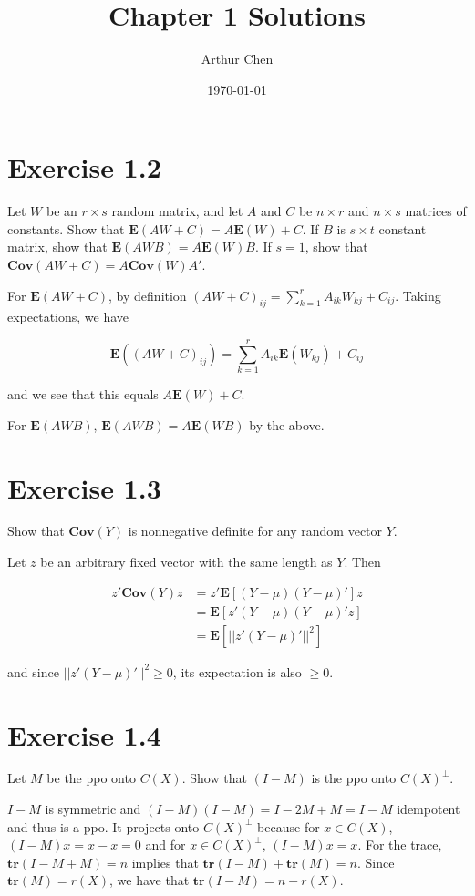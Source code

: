 \documentclass{article}
\author{Arthur Chen}
\title{Chapter 1 Solutions}
\date{\today}
\newcommand{\E}{\boldsymbol{E}}
\newcommand{\cov}{\boldsymbol{Cov}}
\newcommand{\tr}{\boldsymbol{tr}}
\begin{document}
\maketitle

\section*{Exercise 1.2}

Let $W$ be an $r \times s$ random matrix, and let $A$ and $C$ be $n \times r$ and $n \times s$ matrices of constants. Show that $\E(AW+C) = A\E(W) + C$. If $B$ is $s \times t$ constant matrix, show that $\E(AWB) = A\E(W)B$. If $s=1$, show that $\cov(AW+C) = A\cov(W)A'$.

For $\E(AW+C)$, by definition $(AW+C)_{ij} = \sum_{k=1}^r A_{ik}W_{kj} + C_{ij}$. Taking expectations, we have

\[
\E((AW+C)_{ij}) = \sum_{k=1}^r A_{ik}\E(W_{kj}) + C_{ij}
\]

and we see that this equals $A\E(W)+C$.

For $\E(AWB)$, $\E(AWB) = A\E(WB)$ by the above.

\section*{Exercise 1.3}

Show that $\cov(Y)$ is nonnegative definite for any random vector $Y$.

Let $z$ be an arbitrary fixed vector with the same length as $Y$. Then

\begin{align*}
z'\cov(Y)z &= z'\E[(Y-\mu)(Y-\mu)']z \\
&= \E[z'(Y-\mu)(Y-\mu)'z] \\
&= \E[||z'(Y-\mu)'||^2]
\end{align*}

and since $||z'(Y-\mu)'||^2 \geq 0$, its expectation is also $\geq 0$.

\section*{Exercise 1.4}

Let $M$ be the ppo onto $C(X)$. Show that $(I-M)$ is the ppo onto $C(X)^\perp$.

$I-M$ is symmetric and $(I-M)(I-M) = I-2M+M = I-M$ idempotent and thus is a ppo. It projects onto $C(X)^\perp$ because for $x \in C(X)$, $(I-M)x = x-x=0$ and for $x \in C(X)^\perp$, $(I-M)x = x$. For the trace, $\tr(I-M+M) = n$ implies that $\tr(I-M)+\tr(M)=n$. Since $\tr(M)=r(X)$, we have that $\tr(I-M)=n-r(X)$.
\end{document}
